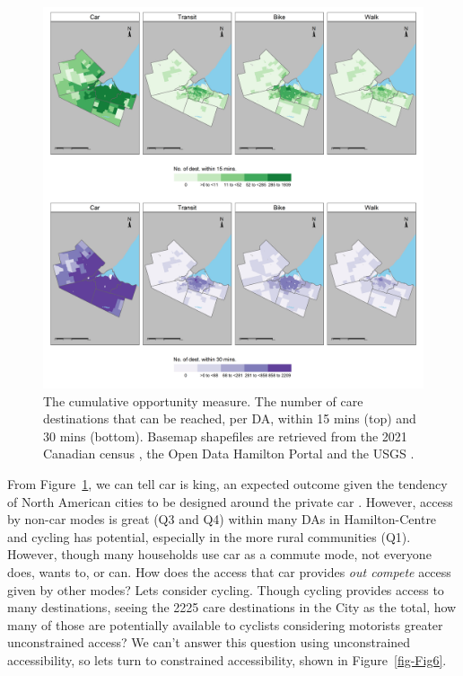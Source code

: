\documentclass[
  super,
  preprint,
  3p]{elsarticle}
\begin{document}
\begin{figure}

{\centering \includegraphics[width=6.25in,height=\textheight]{figures/Fig5-plot_cum_opp_measures.png}

}

\caption{\label{fig-Fig5}The cumulative opportunity measure. The number
of care destinations that can be reached, per DA, within 15 mins (top)
and 30 mins (bottom). Basemap shapefiles are retrieved from the 2021
Canadian census \citep{governmentofcanadaCensusPopulation2023}, the Open
Data Hamilton Portal \citep{opendatahamiltonCityBoundary2023} and the
USGS \citep{greatlakesUSGS2010}.}

\end{figure}

From Figure~\ref{fig-Fig5}, we can tell car is king, an expected outcome
given the tendency of North American cities to be designed around the
private car \citep{saeidizandRevisitingCarDependency2022}. However,
access by non-car modes is great (Q3 and Q4) within many DAs in
Hamilton-Centre and cycling has potential, especially in the more rural
communities (Q1). However, though many households use car as a commute
mode, not everyone does, wants to, or can. How does the access that car
provides \emph{out compete} access given by other modes? Lets consider
cycling. Though cycling provides access to many destinations, seeing the
2225 care destinations in the City as the total, how many of those are
potentially available to cyclists considering motorists greater
unconstrained access? We can't answer this question using unconstrained
accessibility, so lets turn to constrained accessibility, shown in
Figure~\ref{fig-Fig6}.
\end{document}
